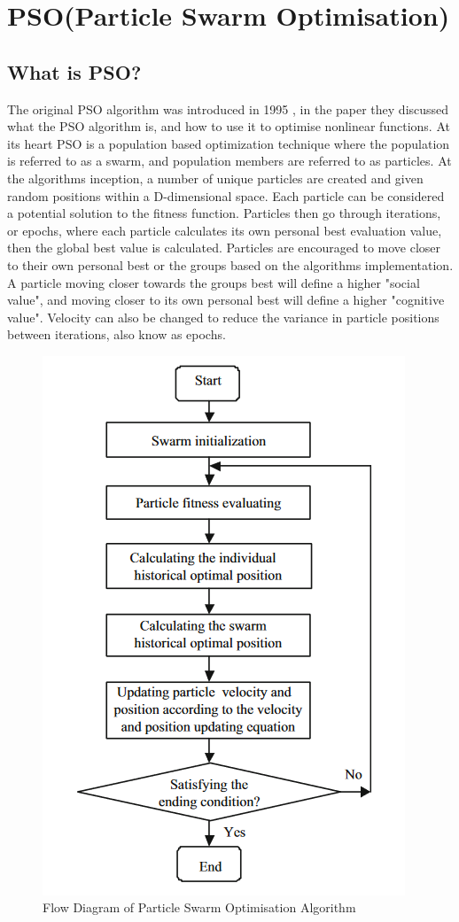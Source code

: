 \documentclass[oneside,12pt]{book}
\begin{document}
\section{PSO(Particle Swarm Optimisation)}
\subsection{What is PSO?}
The original PSO algorithm was introduced in 1995 \cite{kennedy1995particle}, in the paper they discussed what the PSO algorithm is, and how to use it to optimise nonlinear functions. At its heart PSO is a population based optimization technique where the population is referred to as a swarm, and population members are referred to as particles. At the algorithms inception, a number of unique particles are created and given random positions within a D-dimensional space. Each particle can be considered a potential solution to the fitness function. Particles then go through iterations, or epochs, where each particle calculates its own personal best evaluation value, then the global best value is calculated. Particles are encouraged to move closer to their own personal best or the groups based on the algorithms implementation. A particle moving closer towards the groups best will define a higher "social value", and moving closer to its own personal best will define a higher "cognitive value". Velocity can also be changed to reduce the variance in particle positions between iterations, also know as epochs. 
\begin{figure}[H]
    \centering
    \includegraphics[scale=0.6]{Images/PSO_Flow.png}
    \caption{Flow Diagram of Particle Swarm Optimisation Algorithm \cite{wang_tan_liu_2017} }
    \label{fig:Flow Diagram of Particle Swarm Optimisation Algorithm}
\end{figure}
\end{document}
